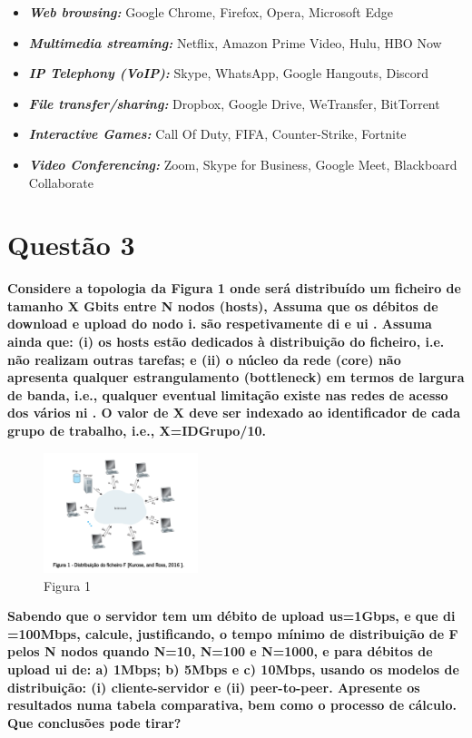 \documentclass[a4paper, 11pt]{article}
\begin{document}
\begin{itemize}
    \item \textit{\textbf{Web browsing:}} Google Chrome, Firefox, Opera, Microsoft Edge
    \item \textit{\textbf{Multimedia streaming:}} Netflix, Amazon Prime Video, Hulu, HBO Now
    \item \textit{\textbf{IP Telephony (VoIP):}} Skype, WhatsApp, Google Hangouts, Discord
    \item \textit{\textbf{File transfer/sharing:}} Dropbox, Google Drive, WeTransfer, BitTorrent
    \item \textit{\textbf{Interactive Games:}} Call Of Duty, FIFA, Counter-Strike, Fortnite
    \item \textit{\textbf{Video Conferencing:}} Zoom, Skype for Business, Google Meet, Blackboard Collaborate
\end{itemize}

\newpage

\section {Questão 3} 
\textbf{Considere a topologia da Figura 1 onde será distribuído um ficheiro de tamanho X Gbits entre N nodos (hosts), Assuma
que os débitos de download e upload do nodo i. são respetivamente di e ui
. Assuma ainda que: (i) os hosts estão dedicados
à distribuição do ficheiro, i.e. não realizam outras tarefas; e (ii) o núcleo da rede (core) não apresenta qualquer
estrangulamento (bottleneck) em termos de largura de banda, i.e., qualquer eventual limitação existe nas redes de acesso
dos vários ni
. O valor de X deve ser indexado ao identificador de cada grupo de trabalho, i.e., X=IDGrupo/10.}

 \begin{figure}[hbt!]
     \centering
     \includegraphics[width=0.4\textwidth]{images/figura1.png}
     \caption{Figura 1}
     \label{fig:my_label}
 \end{figure}
 
\textbf{Sabendo que o servidor tem um débito de upload us=1Gbps, e que di
=100Mbps, calcule, justificando, o tempo mínimo de
distribuição de F pelos N nodos quando N=10, N=100 e N=1000, e para débitos de upload ui de: a) 1Mbps; b) 5Mbps e
c) 10Mbps, usando os modelos de distribuição: (i) cliente-servidor e (ii) peer-to-peer.
Apresente os resultados numa tabela comparativa, bem como o processo de cálculo. Que conclusões pode tirar?}
\end{document}
